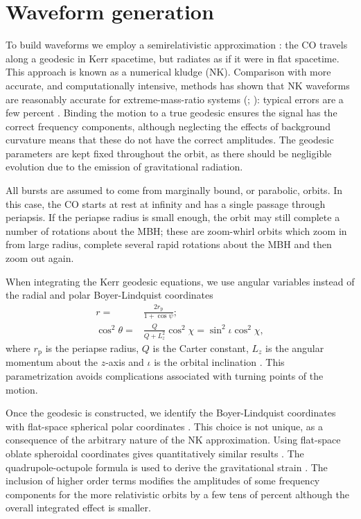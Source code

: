 \documentclass[useAMS,usedcolumn,usegraphicx,usenatbib]{mn2e}
\newcommand{\sub}[1]{\ensuremath{_\mathrm{#1}}}
\begin{document}
\section{Waveform generation}\label{sec:Wave}

To build waveforms we employ a semirelativistic approximation \citep{Ruffini1981}: the CO travels along a geodesic in Kerr spacetime, but radiates as if it were in flat spacetime. This approach is known as a numerical kludge (NK). Comparison with more accurate, and computationally intensive, methods has shown that NK waveforms are reasonably accurate for extreme-mass-ratio systems (\citealt*{Gair2005}; \citealt{Babak2007}): typical errors are a few percent \citep{Tanaka1993,Gair2005,Berry2013}. Binding the motion to a true geodesic ensures the signal has the correct frequency components, although neglecting the effects of background curvature means that these do not have the correct amplitudes. The geodesic parameters are kept fixed throughout the orbit, as there should be negligible evolution due to the emission of gravitational radiation.

All bursts are assumed to come from marginally bound, or parabolic, orbits. In this case, the CO starts at rest at infinity and has a single passage through periapsis. If the periapse radius is small enough, the orbit may still complete a number of rotations about the MBH; these are zoom-whirl orbits \citep{Glampedakis2002a} which zoom in from large radius, complete several rapid rotations about the MBH and then zoom out again.

When integrating the Kerr geodesic equations, we use angular variables instead of the radial and polar Boyer-Lindquist coordinates \citep{Drasco2004}
\begin{align}
r = {} & \frac{2 r\sub{p}}{1 + \cos\psi};\\
\cos^2\theta = {} & \frac{Q}{Q+L_z^2}\cos^2\chi = \sin^2 \iota \cos^2\chi,
\end{align}
where $r\sub{p}$ is the periapse radius, $Q$ is the Carter constant, $L_z$ is the angular momentum about the $z$-axis and $\iota$ is the orbital inclination \citep*{Glampedakis2002}. This parametrization avoids complications associated with turning points of the motion.

Once the geodesic is constructed, we identify the Boyer-Lindquist coordinates with flat-space spherical polar coordinates \citep{Gair2005, Babak2007}. This choice is not unique, as a consequence of the arbitrary nature of the NK approximation. Using flat-space oblate spheroidal coordinates gives quantitatively similar results \citep{Berry2013}. The quadrupole-octupole formula is used to derive the gravitational strain \citep{Bekenstein1973, Press1977, Babak2007, Yunes2008}. The inclusion of higher order terms modifies the amplitudes of some frequency components for the more relativistic orbits by a few tens of percent although the overall integrated effect is smaller.
\end{document}
